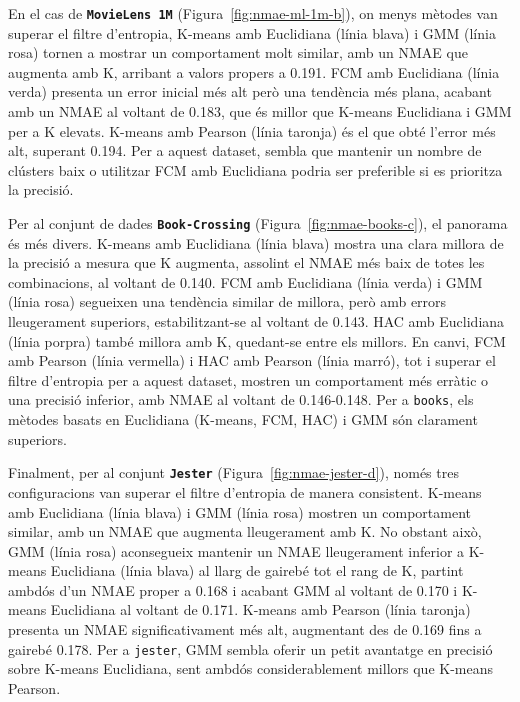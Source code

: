\documentclass[a4paper,12pt]{report}
\begin{document}
En el cas de \textbf{\texttt{MovieLens 1M}} (Figura~\ref{fig:nmae-ml-1m-b}), on menys mètodes van superar el filtre d'entropia, K-means amb Euclidiana (línia blava) i GMM (línia rosa) tornen a mostrar un comportament molt similar, amb un NMAE que augmenta amb K, arribant a valors propers a 0.191. FCM amb Euclidiana (línia verda) presenta un error inicial més alt però una tendència més plana, acabant amb un NMAE al voltant de 0.183, que és millor que K-means Euclidiana i GMM per a K elevats. K-means amb Pearson (línia taronja) és el que obté l'error més alt, superant 0.194. Per a aquest dataset, sembla que mantenir un nombre de clústers baix o utilitzar FCM amb Euclidiana podria ser preferible si es prioritza la precisió.

Per al conjunt de dades \textbf{\texttt{Book-Crossing}} (Figura~\ref{fig:nmae-books-c}), el panorama és més divers. K-means amb Euclidiana (línia blava) mostra una clara millora de la precisió a mesura que K augmenta, assolint el NMAE més baix de totes les combinacions, al voltant de 0.140. FCM amb Euclidiana (línia verda) i GMM (línia rosa) segueixen una tendència similar de millora, però amb errors lleugerament superiors, estabilitzant-se al voltant de 0.143. HAC amb Euclidiana (línia porpra) també millora amb K, quedant-se entre els millors. En canvi, FCM amb Pearson (línia vermella) i HAC amb Pearson (línia marró), tot i superar el filtre d'entropia per a aquest dataset, mostren un comportament més erràtic o una precisió inferior, amb NMAE al voltant de 0.146-0.148. Per a \texttt{books}, els mètodes basats en Euclidiana (K-means, FCM, HAC) i GMM són clarament superiors.

Finalment, per al conjunt \textbf{\texttt{Jester}} (Figura~\ref{fig:nmae-jester-d}), només tres configuracions van superar el filtre d'entropia de manera consistent. K-means amb Euclidiana (línia blava) i GMM (línia rosa) mostren un comportament similar, amb un NMAE que augmenta lleugerament amb K. No obstant això, GMM (línia rosa) aconsegueix mantenir un NMAE lleugerament inferior a K-means Euclidiana (línia blava) al llarg de gairebé tot el rang de K, partint ambdós d'un NMAE proper a 0.168 i acabant GMM al voltant de 0.170 i K-means Euclidiana al voltant de 0.171. K-means amb Pearson (línia taronja) presenta un NMAE significativament més alt, augmentant des de 0.169 fins a gairebé 0.178. Per a \texttt{jester}, GMM sembla oferir un petit avantatge en precisió sobre K-means Euclidiana, sent ambdós considerablement millors que K-means Pearson.
\end{document}
